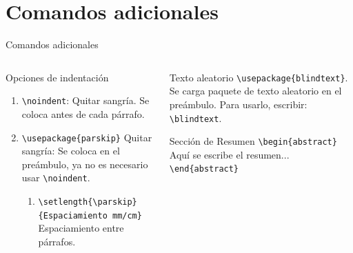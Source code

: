 \documentclass[aspectratio=169, 10pt]{beamer}
\begin{document}
\section{Comandos adicionales}
\begin{frame}[fragile]{Comandos adicionales}
    \begin{columns}
        \begin{column}{.6\linewidth} 
            \begin{block}{Opciones de indentación}
            \begin{enumerate} \pause
                \item \verb|\noindent|: Quitar sangría. Se coloca antes de cada párrafo. \pause
                \item  \verb|\usepackage{parskip}| Quitar sangría: Se coloca en el preámbulo, ya no es necesario usar \verb|\noindent|. \pause
                \begin{enumerate}
                    \item \verb|\setlength{\parskip}{Espaciamiento mm/cm}| Espaciamiento entre párrafos. \pause
                \end{enumerate}
            \end{enumerate}
            \end{block}    
        \end{column}    
    
    
        \begin{column}{.45\linewidth} 
            \begin{block}{Texto aleatorio} \pause
                \verb|\usepackage{blindtext}|. Se carga paquete de texto aleatorio en el preámbulo. Para usarlo, escribir: \verb|\blindtext|. \pause
            \end{block}    
            \begin{block}{Sección de Resumen} \pause
                \verb|\begin{abstract}| \\
                   \hspace{3mm} Aquí se escribe el resumen...\\ 
                \verb|\end{abstract}|
            \end{block} 
        \end{column}    
    \end{columns}
\end{frame}
\end{document}
